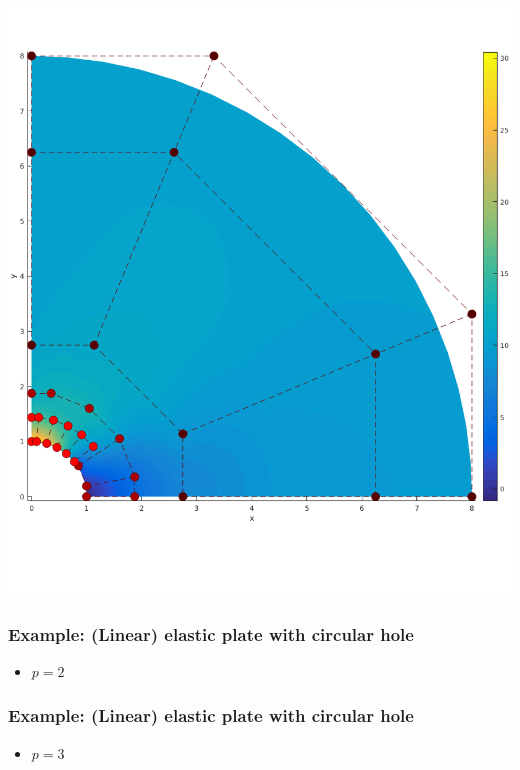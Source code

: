 \documentclass{beamer}
\begin{document}
\begin{frame}
\begin{minipage}{0.49\textwidth}
		\includegraphics[scale=0.24]{pics/plateWithAHole/plate_controlnet_3.png}
	\end{minipage}
\end{frame}

\begin{frame}
	\frametitle{Example: (Linear) elastic plate with circular hole }%
	\begin{itemize}
		\item $ p=2 $
	\end{itemize}
	
\end{frame}

\begin{frame}
	\frametitle{Example: (Linear) elastic plate with circular hole }%
	\begin{itemize}
		\item $ p=3 $
	\end{itemize}
	
\end{frame}





\end{document}

